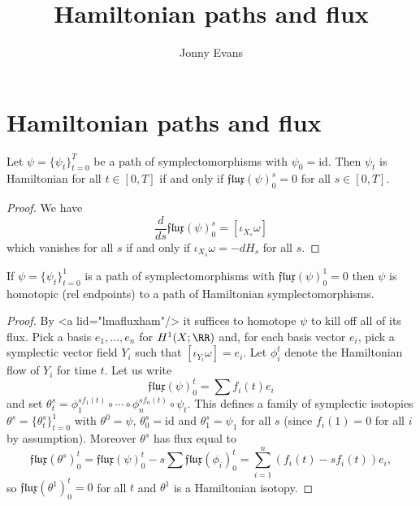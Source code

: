\documentclass{article}
\title{Hamiltonian paths and flux}
\author{Jonny Evans}
\begin{document}
\section{Hamiltonian paths and flux}

\begin{Lemma}[lmafluxham]
  Let $\psi=\{\psi_t\}_{t=0}^T$ be a path of symplectomorphisms with $\psi_0=\mathrm{id}$. Then $\psi_t$ is Hamiltonian for all $t\in[0,T]$ if and only if $\mathfrak{flux}(\psi)_0^s=0$ for all $s\in[0,T]$.
\end{Lemma}
\begin{proof}
  We have
  \[\frac{d}{ds}\mathfrak{flux}(\psi)_0^s=[\iota_{X_s}\omega]\]
  which vanishes for all $s$ if and only if $\iota_{X_s}\omega=-dH_s$ for all $s$.
\end{proof}

\begin{Proposition}[thmfluxham]
  If $\psi=\{\psi_t\}_{t=0}^1$ is a path of symplectomorphisms with $\mathfrak{flux}(\psi)_0^1=0$ then $\psi$ is homotopic (rel endpoints) to a path of Hamiltonian symplectomorphisms.
\end{Proposition}
\begin{proof}
  By <a lid="lmafluxham"/> it suffices to homotope $\psi$ to kill off all of its flux. Pick a basis $e_1,\ldots,e_n$ for $H^1(X;\RR)$ and, for each basis vector $e_i$, pick a symplectic vector field $Y_i$ such that $[\iota_{Y_i}\omega]=e_i$. Let $\phi_i^t$ denote the Hamiltonian flow of $Y_i$ for time $t$. Let us write
  \[\mathfrak{flux}(\psi)_0^t=\sum f_i(t)e_i\]
  and set $\theta^s_t=\phi_1^{sf_1(t)}\circ\cdots\circ\phi_n^{sf_n(t)}\circ\psi_t$. This defines a family of symplectic isotopies $\theta^s=\{\theta^s_t\}_{t=0}^1$ with $\theta^0=\psi$, $\theta^s_0=\mathrm{id}$ and $\theta^s_1=\psi_1$ for all $s$ (since $f_i(1)=0$ for all $i$ by assumption). Moreover $\theta^s$ has flux equal to
  \[\mathfrak{flux}(\theta^s)_0^t=\mathfrak{flux}(\psi)_0^t-s\sum\mathfrak{flux}(\phi_i)_0^t=\sum_{i=1}^n(f_i(t)-sf_i(t))e_i,\]
  so $\mathfrak{flux}(\theta^1)_0^t=0$ for all $t$ and $\theta^1$ is a Hamiltonian isotopy.
\end{proof}
\end{document}

